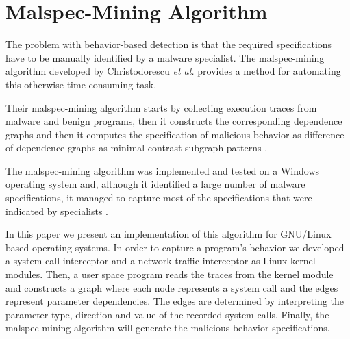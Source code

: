 \section{Malspec-Mining Algorithm}
\label{sec:malspec-alg}

The problem with behavior-based detection is that the required specifications have to be manually identified by a malware specialist. The malspec-mining algorithm developed by Christodorescu \textit{et al.} \cite{mining-specifications} provides a method for automating this otherwise time consuming task. 

Their malspec-mining algorithm starts by collecting execution traces from malware and benign programs, then it constructs the corresponding dependence graphs and then it computes the specification of malicious behavior as difference of dependence graphs as minimal contrast subgraph patterns \cite{minimal-contrast-subgraph}.

The malspec-mining algorithm was implemented and tested on a Windows operating system and, although it identified a large number of malware specifications, it managed to capture most of the specifications that were indicated by specialists \cite{mining-specifications}.

In this paper we present an implementation of this algorithm for GNU/Linux based operating systems. In order to capture a program’s behavior we developed a system call interceptor and a network traffic interceptor as Linux kernel modules. Then, a user space program reads the traces from the kernel module and constructs a graph where each node represents a system call and the edges represent parameter dependencies. The edges are determined by interpreting the parameter type, direction and value of the recorded system calls. Finally, the malspec-mining algorithm will generate the malicious behavior specifications.
